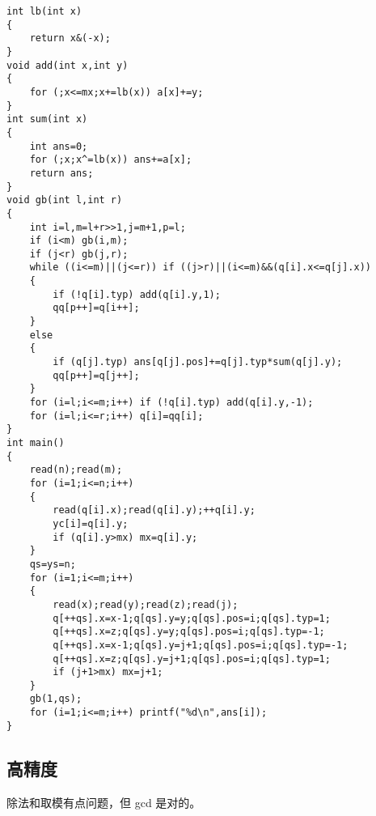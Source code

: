 \documentclass[12pt]{ctexart}
\begin{document}
\begin{lstlisting}
int lb(int x)
{
	return x&(-x);
}
void add(int x,int y)
{
	for (;x<=mx;x+=lb(x)) a[x]+=y;
}
int sum(int x)
{
	int ans=0;
	for (;x;x^=lb(x)) ans+=a[x];
	return ans;
}
void gb(int l,int r)
{
	int i=l,m=l+r>>1,j=m+1,p=l;
	if (i<m) gb(i,m);
	if (j<r) gb(j,r);
	while ((i<=m)||(j<=r)) if ((j>r)||(i<=m)&&(q[i].x<=q[j].x))
	{
		if (!q[i].typ) add(q[i].y,1);
		qq[p++]=q[i++];
	}
	else
	{
		if (q[j].typ) ans[q[j].pos]+=q[j].typ*sum(q[j].y);
		qq[p++]=q[j++];
	}
	for (i=l;i<=m;i++) if (!q[i].typ) add(q[i].y,-1);
	for (i=l;i<=r;i++) q[i]=qq[i];
}
int main()
{
	read(n);read(m);
	for (i=1;i<=n;i++)
	{
		read(q[i].x);read(q[i].y);++q[i].y;
		yc[i]=q[i].y;
		if (q[i].y>mx) mx=q[i].y;
	}
	qs=ys=n;
	for (i=1;i<=m;i++)
	{
		read(x);read(y);read(z);read(j);
		q[++qs].x=x-1;q[qs].y=y;q[qs].pos=i;q[qs].typ=1;
		q[++qs].x=z;q[qs].y=y;q[qs].pos=i;q[qs].typ=-1;
		q[++qs].x=x-1;q[qs].y=j+1;q[qs].pos=i;q[qs].typ=-1;
		q[++qs].x=z;q[qs].y=j+1;q[qs].pos=i;q[qs].typ=1;
		if (j+1>mx) mx=j+1;
	}
	gb(1,qs);
	for (i=1;i<=m;i++) printf("%d\n",ans[i]);
}
\end{lstlisting}

\subsection{高精度}

除法和取模有点问题，但 gcd 是对的。
\end{document}
